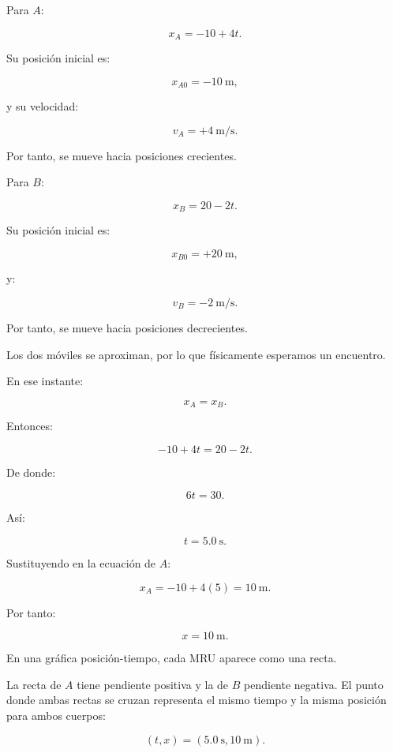 \begin{explicacion}
Para \(A\):

\[ x_A=-10+4t. \]

Su posición inicial es:

\[ x_{A0}=-\SI{10}{\meter}, \]

y su velocidad:

\[ v_A=+\SI{4}{\meter\per\second}. \]

Por tanto, se mueve hacia posiciones crecientes.

Para \(B\):

\[ x_B=20-2t. \]

Su posición inicial es:

\[ x_{B0}=+\SI{20}{\meter}, \]

y:

\[ v_B=-\SI{2}{\meter\per\second}. \]

Por tanto, se mueve hacia posiciones decrecientes.

Los dos móviles se aproximan, por lo que físicamente esperamos un encuentro.

En ese instante:

\[ x_A=x_B. \]

Entonces:

\[
-10+4t=20-2t.
\]

De donde:

\[
6t=30.
\]

Así:

\[ \boxed{t=\SI{5.0}{\second}}. \]

Sustituyendo en la ecuación de \(A\):

\[
x_A
=
-10+4(5)
=
\SI{10}{\meter}.
\]

Por tanto:

\[ \boxed{x=\SI{10}{\meter}}. \]

En una gráfica posición-tiempo, cada MRU aparece como una recta.

La recta de \(A\) tiene pendiente positiva y la de \(B\) pendiente negativa. El punto donde ambas rectas se cruzan representa el mismo tiempo y la misma posición para ambos cuerpos:

\[
(t,x)
=
(\SI{5.0}{\second},\SI{10}{\meter}).
\]
\end{explicacion}


